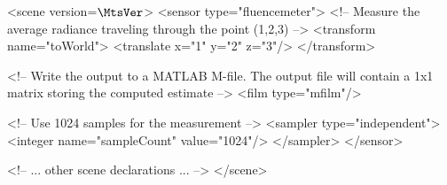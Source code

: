 \vspace{4mm}
\begin{xml}
<scene version=$\MtsVer$>
    <sensor type="fluencemeter">
        <!-- Measure the average radiance traveling
             through the point (1,2,3) -->
        <transform name="toWorld">
            <translate x="1" y="2" z="3"/>
        </transform>

        <!-- Write the output to a MATLAB M-file. The output file will
             contain a 1x1 matrix storing the computed estimate -->
        <film type="mfilm"/>

        <!-- Use 1024 samples for the measurement -->
        <sampler type="independent">
            <integer name="sampleCount" value="1024"/>
        </sampler>
    </sensor>

    <!-- ... other scene declarations ... -->
</scene>
\end{xml}
